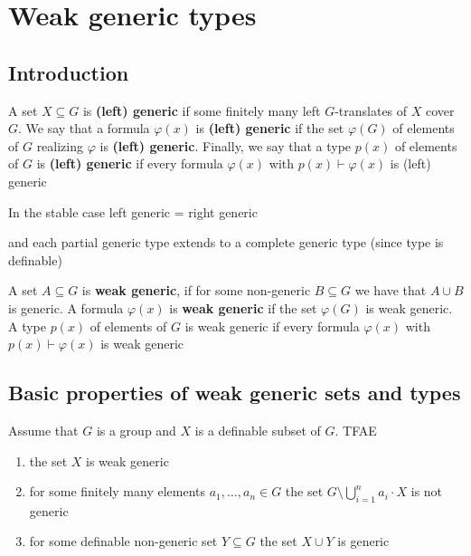 \documentclass[11pt]{article}
\begin{document}
\section{Weak generic types}
\label{sec:org05fe1dd}
\subsection{Introduction}
\label{sec:orga0723b8}
\begin{definition}[]
A set \(X\subseteq G\) is \textbf{(left) generic} if some finitely many left \(G\)-translates of \(X\)
cover \(G\). We say that a formula \(\varphi(x)\) is \textbf{(left) generic} if the set \(\varphi(G)\) of elements
of \(G\) realizing \(\varphi\) is \textbf{(left) generic}. Finally, we say that a type \(p(x)\) of elements
of \(G\) is \textbf{(left) generic} if every formula \(\varphi(x)\) with \(p(x)\vdash\varphi(x)\) is (left) generic
\end{definition}

In the stable case left generic = right generic \label{Problem1}

and each partial generic type extends to a complete generic type (since type is definable)

\begin{definition}[]
A set \(A\subseteq G\) is \textbf{weak generic}, if for some non-generic \(B\subseteq G\) we have that \(A\cup B\) is
generic. A formula \(\varphi(x)\) is \textbf{weak generic} if the set \(\varphi(G)\) is weak generic. A type \(p(x)\)
of elements of \(G\) is weak generic if every formula \(\varphi(x)\) with \(p(x)\vdash\varphi(x)\) is weak generic
\end{definition}

\subsection{Basic properties of weak generic sets and types}
\label{sec:org01ee055}
\begin{lemma}[]
\label{3.2.1}
Assume that \(G\) is a group and \(X\) is a definable subset of \(G\). TFAE
\begin{enumerate}
\item the set \(X\) is weak generic
\item for some finitely many elements \(a_1,\dots,a_n\in G\) the set \(G\setminus\bigcup_{i=1}^na_i\cdot X\) is not generic
\item for some definable non-generic set \(Y\subseteq G\) the set \(X\cup Y\) is generic
\end{enumerate}
\end{lemma}
\end{document}
